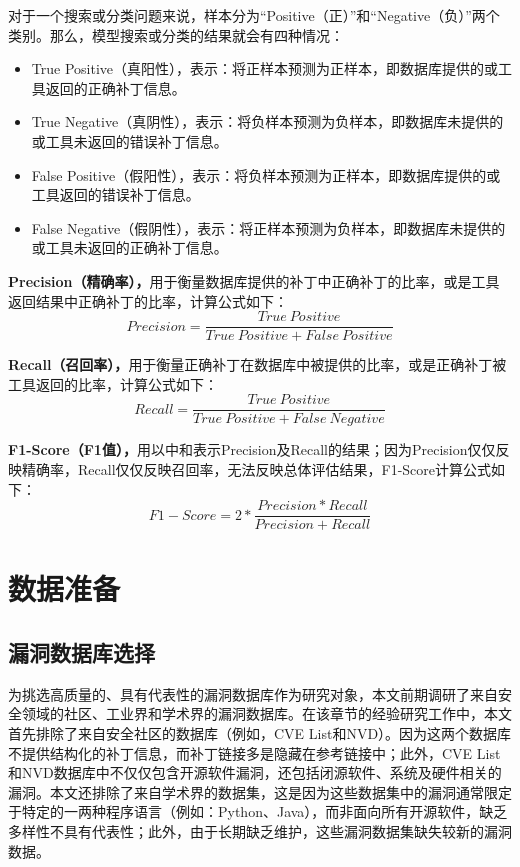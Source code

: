 对于一个搜索或分类问题来说，样本分为“Positive（正）”和“Negative（负）”两个类别。那么，模型搜索或分类的结果就会有四种情况：
\begin{itemize}
    \item True Positive（真阳性），表示：将正样本预测为正样本，即数据库提供的或工具返回的正确补丁信息。
    \item True Negative（真阴性），表示：将负样本预测为负样本，即数据库未提供的或工具未返回的错误补丁信息。
    \item False Positive（假阳性），表示：将负样本预测为正样本，即数据库提供的或工具返回的错误补丁信息。
    \item False Negative（假阴性），表示：将正样本预测为负样本，即数据库未提供的或工具未返回的正确补丁信息。
\end{itemize}

\textbf{Precision（精确率），}用于衡量数据库提供的补丁中正确补丁的比率，或是工具返回结果中正确补丁的比率，计算公式如下：
\begin{equation}\label{eq:precision}
    Precision=\frac{True\ Positive}{True\ Positive + False\ Positive} 
\end{equation}

\textbf{Recall（召回率），}用于衡量正确补丁在数据库中被提供的比率，或是正确补丁被工具返回的比率，计算公式如下：
\begin{equation}\label{eq:recall}
    Recall=\frac{True\ Positive}{True\ Positive + False\ Negative} 
\end{equation}

\textbf{F1-Score（F1值），}用以中和表示Precision及Recall的结果；因为Precision仅仅反映精确率，Recall仅仅反映召回率，无法反映总体评估结果，F1-Score计算公式如下：
\begin{equation}\label{eq:f1}
    F1-Score=2*\frac{Precision*Recall}{Precision + Recall} 
\end{equation}

\section{数据准备}\label{sec:preparation}
\subsection{漏洞数据库选择}
为挑选高质量的、具有代表性的漏洞数据库作为研究对象，本文前期调研了来自安全领域的社区、工业界和学术界的漏洞数据库。在该章节的经验研究工作中，本文首先排除了来自安全社区的数据库（例如，CVE List和NVD）。因为这两个数据库不提供结构化的补丁信息，而补丁链接多是隐藏在参考链接中；此外，CVE List和NVD数据库中不仅仅包含开源软件漏洞，还包括闭源软件、系统及硬件相关的漏洞。本文还排除了来自学术界的数据集\cite{ponta2019manually,fan2020ac,jimenez2018enabling,gkortzis2018vulinoss,namrud2019androvul,li2017large,liu2020large,antal2020exploring}，这是因为这些数据集中的漏洞通常限定于特定的一两种程序语言（例如：Python、Java），而非面向所有开源软件，缺乏多样性不具有代表性；此外，由于长期缺乏维护，这些漏洞数据集缺失较新的漏洞数据。


